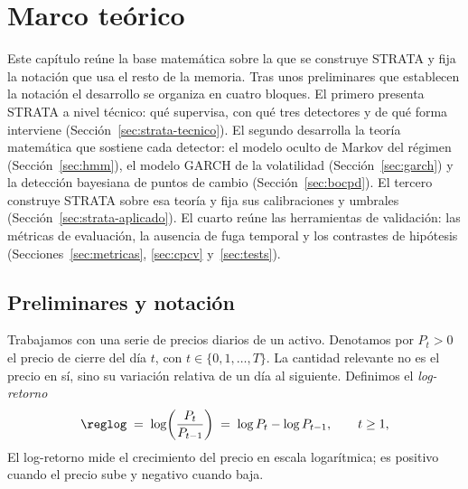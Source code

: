 \chapter{Marco teórico}
\label{cap:marco-teorico}


Este capítulo reúne la base matemática sobre la que se construye STRATA y fija la notación que usa el resto de la memoria. Tras unos preliminares que establecen la notación el desarrollo se organiza en cuatro bloques. El primero presenta STRATA a nivel técnico: qué supervisa, con qué tres detectores y de qué forma interviene (Sección~\ref{sec:strata-tecnico}). El segundo desarrolla la teoría matemática que sostiene cada detector: el modelo oculto de Markov del régimen (Sección~\ref{sec:hmm}), el modelo GARCH de la volatilidad (Sección~\ref{sec:garch}) y la detección bayesiana de puntos de cambio (Sección~\ref{sec:bocpd}). El tercero construye STRATA sobre esa teoría y fija sus calibraciones y umbrales (Sección~\ref{sec:strata-aplicado}). El cuarto reúne las herramientas de validación: las métricas de evaluación, la ausencia de fuga temporal y los contrastes de hipótesis (Secciones~\ref{sec:metricas}, \ref{sec:cpcv} y~\ref{sec:tests}). 

\section{Preliminares y notación}
\label{sec:preliminares}

Trabajamos con una serie de precios diarios de un activo. Denotamos por $P_t > 0$ el precio de cierre del día $t$, con $t \in \{0, 1, \dots, T\}$. La cantidad relevante no es el precio en sí, sino su variación relativa de un día al siguiente. Definimos el \emph{log-retorno}
\[
\reglog \;=\; \log\!\left(\frac{P_t}{P_{t-1}}\right) \;=\; \log P_t - \log P_{t-1}, \qquad t \ge 1,
\]
El log-retorno mide el crecimiento del precio en escala logarítmica; es positivo cuando el precio sube y negativo cuando baja.

